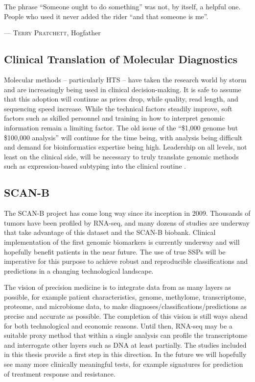 \documentclass[11pt]{book}
\newcommand{\scanb}{\mbox{SCAN-B}}
\begin{document}
\epigraph{The phrase ``Someone ought to do something'' was not, by itself, a helpful one. People who used it never added the rider ``and that someone is me''.}{--- \textsc{Terry Pratchett}\small\textnormal{, Hogfather}}

\subsection*{Clinical Translation of Molecular Diagnostics}

Molecular methods -- particularly HTS -- have taken the research world by storm and are increasingly being used in clinical decision-making. It is safe to assume that this adoption will continue as prices drop, while quality, read length, and sequencing speed increase. While the technical factors steadily improve, soft factors such as skilled personnel and training in how to interpret genomic information remain a limiting factor. The old issue of the ``\$1,000 genome but \$100,000 analysis'' \cite{Mardis:2010} will continue for the time being, with analysis being difficult and demand for bioinformatics expertise being high. Leadership on all levels, not least on the clinical side, will be necessary to truly translate genomic methods such as expression-based subtyping into the clinical routine \cite{Best:2020}.


\subsection*{\scanb{}}

The \scanb{} project has come long way since its inception in 2009. Thousands of tumors have been profiled by RNA-seq, and many dozens of studies are underway that take advantage of this dataset and the \scanb{} biobank. Clinical implementation of the first genomic biomarkers is currently underway and will hopefully benefit patients in the near future. The use of true SSPs will be imperative for this purpose to achieve robust and reproducible classifications and predictions in a changing technological landscape.

The vision of precision medicine is to integrate data from as many layers as possible, for example patient characteristics, genome, methylome, transcriptome, proteome, and microbiome data, to make diagnoses/classifications/predictions as precise and accurate as possible. The completion of this vision is still ways ahead for both technological and economic reasons. Until then, RNA-seq may be a suitable proxy method that within a single analysis can profile the transcriptome and interrogate other layers such as DNA at least partially. The studies included in this thesis provide a first step in this direction. In the future we will hopefully see many more clinically meaningful tests, for example signatures for prediction of treatment response and resistance. 
\end{document}
